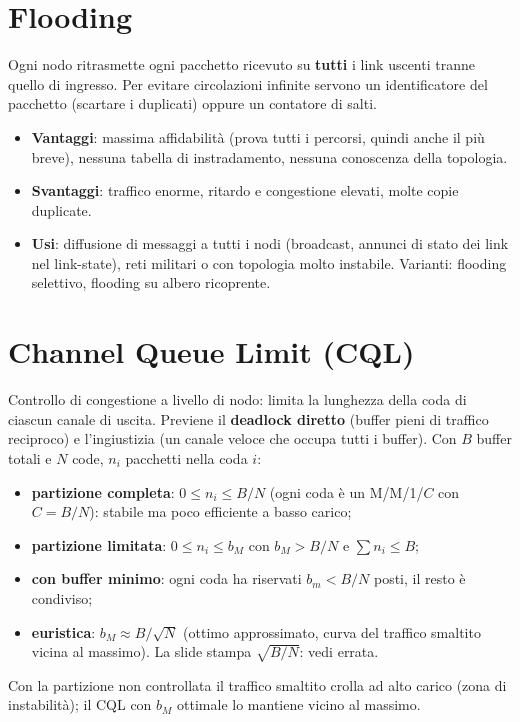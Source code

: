 \section{Flooding}
Ogni nodo ritrasmette ogni pacchetto ricevuto su \textbf{tutti} i link uscenti tranne quello di ingresso. Per evitare circolazioni infinite servono un identificatore del pacchetto (scartare i duplicati) oppure un contatore di salti.
\begin{itemize}[nosep]
\item \textbf{Vantaggi}: massima affidabilità (prova tutti i percorsi, quindi anche il più breve), nessuna tabella di instradamento, nessuna conoscenza della topologia.
\item \textbf{Svantaggi}: traffico enorme, ritardo e congestione elevati, molte copie duplicate.
\item \textbf{Usi}: diffusione di messaggi a tutti i nodi (broadcast, annunci di stato dei link nel link-state), reti militari o con topologia molto instabile. Varianti: flooding selettivo, flooding su albero ricoprente.
\end{itemize}

\section{Channel Queue Limit (CQL)}
Controllo di congestione a livello di nodo: limita la lunghezza della coda di ciascun canale di uscita. Previene il \textbf{deadlock diretto} (buffer pieni di traffico reciproco) e l'ingiustizia (un canale veloce che occupa tutti i buffer). Con $B$ buffer totali e $N$ code, $n_i$ pacchetti nella coda $i$:
\begin{itemize}[nosep]
\item \textbf{partizione completa}: $0\le n_i\le B/N$ (ogni coda è un M/M/1/$C$ con $C=B/N$): stabile ma poco efficiente a basso carico;
\item \textbf{partizione limitata}: $0\le n_i\le b_M$ con $b_M>B/N$ e $\sum n_i\le B$;
\item \textbf{con buffer minimo}: ogni coda ha riservati $b_m<B/N$ posti, il resto è condiviso;
\item \textbf{euristica}: $b_M\approx B/\sqrt N$ (ottimo approssimato, curva del traffico smaltito vicina al massimo). La slide stampa $\sqrt{B/N}$: vedi errata.
\end{itemize}
Con la partizione non controllata il traffico smaltito crolla ad alto carico (zona di instabilità); il CQL con $b_M$ ottimale lo mantiene vicino al massimo.

